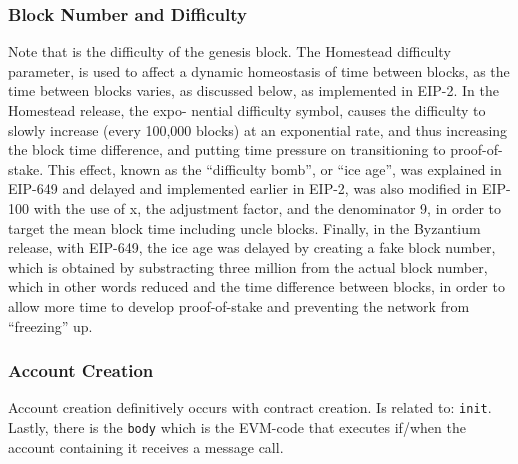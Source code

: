 \documentclass[10pt,a4paper,leqno,bibliography=totoc]{scrartcl}
\newenvironment{alphafootnotes}
{\par\edef\savedfootnotenumber{\number\value{footnote}}
\renewcommand{\thefootnote}{\alph{footnote}}
\setcounter{footnote}{0}}
{\par\setcounter{footnote}{\savedfootnotenumber}}
\begin{document}
\begin{alphafootnotes}
\begin{multicols*}{2}
					\subsubsection{Block Number and Difficulty}
						Note that is the difficulty of the genesis block. The Homestead difficulty parameter, is used to affect a dynamic homeostasis of time between blocks, as the time between blocks varies, as discussed below, as implemented in EIP-2. In the Homestead release, the expo- nential difficulty symbol, causes the difficulty to slowly increase (every 100,000 blocks) at an exponential rate, and thus increasing the block time difference, and putting time pressure on transitioning to proof-of-stake. This effect, known as the “difficulty bomb”, or “ice age”, was explained in EIP-649 and delayed and implemented earlier in EIP-2, was also modified in EIP-100 with the use of x, the adjustment factor, and the denominator 9, in order to target the mean block time including uncle blocks. Finally, in the Byzantium release, with EIP-649, the ice age was delayed by creating a fake block number, which is obtained by substracting three million from the actual block number, which in other words reduced and the time difference between blocks, in order to allow more time to develop proof-of-stake and preventing the network from “freezing” up.\supercite{Wood2017}
					
					\subsubsection{Account Creation} 

					Account creation definitively occurs with contract creation. Is related to: \texttt{init}. Lastly, there is the \texttt{body} which is the EVM-code that executes if/when the account containing it receives a message call.


\end{multicols*}
\end{alphafootnotes}
\end{document}
